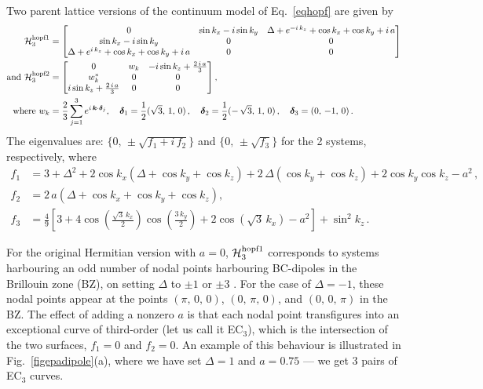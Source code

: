 \documentclass[aps, prb, onecolumn, nofootinbib, citeautoscript, 10pt]{revtex4-2}
\def \nn{\nonumber \\}
\begin{document}
Two parent lattice versions of the continuum model of Eq.~\eqref{eqhopf} are given by
 \begin{align}
\label{eqhopf-lat}
\mathcal H^{\rm hopf1}_3 &= \begin{bmatrix}
0 & \sin k_x-i \sin k_y & \Delta + e^{-i\, k_z}+\cos k_x +\cos k_y + i\, a\\
\sin k_x-i \sin k_y & 0 & 0 \\ 
\Delta + e^{i\, k_z}+\cos k_x +\cos k_y + i\, a  & 0 & 0 \\
\end{bmatrix} \nn 
\text{and }\mathcal H^{\rm hopf2}_3 & = \begin{bmatrix}
0 & w_k & -i\sin k_z + \frac{2\,i\, a} {3}\\
w_k^* & 0 & 0 \\ 
i \sin k_z+ \frac{2\,i\, a} {3}  & 0 & 0 \\
\end{bmatrix}, \nn\text{ where }
w_k  &= \frac{2}{3} \sum_{j=1}^3 e^{ i\, {\boldsymbol k}\cdot {\boldsymbol \delta}_j },\quad
{\boldsymbol \delta}_1 =\frac{1}{2}(\sqrt 3,\, 1,\,0) \,,\quad
{\boldsymbol \delta}_2 =\frac{1}{2}( -\,\sqrt 3,\, 1,\,0)\,,\quad
{\boldsymbol \delta}_3 = (0,\,- 1,\,0)\,.
\end{align}
The eigenvalues are: $\lbrace 0, \, \pm \sqrt{f_1+ i\, f_2} \rbrace $ and $\lbrace 0, \, \pm \sqrt{ f_3}\rbrace $ for the 2 systems, respectively, where
\begin{align}
f_1 &= 3+\Delta ^2+2 \cos k_x \left(\Delta +\cos k_y +\cos k_z \right) + 2 \, \Delta  \left(\cos k_y +\cos k_z \right)
+ 2 \cos k_y \cos k_z -a^2 \,,\nn
f_2 &= 2 \,a \left(\Delta +\cos  k_x +\cos  k_y +\cos k_z\right),\nn
f_3 & = \frac{4}{9}\left [3+4 \cos \left(\frac{\sqrt{3}\, k_x}{2}\right) \cos \left(\frac{3\, k_y}{2}\right)
+2 \cos \left(\sqrt{3} \, k_x\right) - a^2 \right ] +  \sin^2 k_z\,.
\end{align}


For the original Hermitian version with $a=0$, $\mathcal H^{\rm hopf1}_3$ corresponds to systems harbouring an odd number of nodal points harbouring BC-dipoles in the Brillouin zone (BZ), on setting $\Delta $ to $\pm 1$ or $\pm 3$ \cite{graf-hopf}. For the case of $\Delta = -1$, these nodal points appear at the points $ (\pi, \,0,\, 0)$, $ (0,\,\pi, \,0 )$, and $ (0,\, 0,\,\pi)$ in the BZ. The effect of adding a nonzero $a$ is that each nodal point transfigures into an exceptional curve of third-order (let us call it EC$_3$), which is the intersection of the two surfaces, $f_1 = 0 $ and $f_2=0$. An example of this behaviour is illustrated in Fig.~\ref{figepadipole}(a), where we have set $\Delta = 1$ and $ a=0.75 $ --- we get 3 pairs of EC$_3$ curves.
\end{document}

